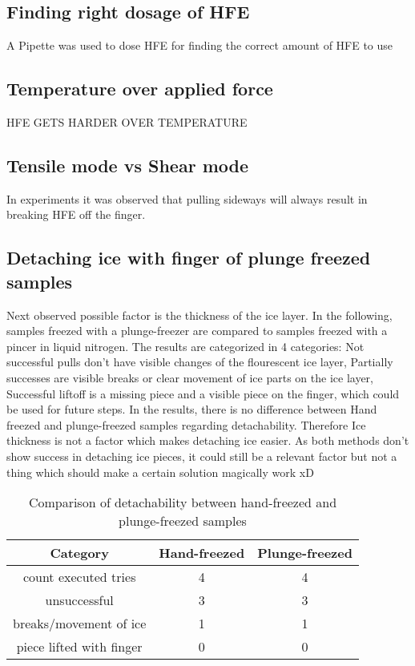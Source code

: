 \subsection{Finding right dosage of HFE}
A Pipette was used to dose HFE for finding the correct amount of HFE to use 

	
\subsection{Temperature over applied force}

HFE GETS HARDER OVER TEMPERATURE

\subsection{Tensile mode vs Shear mode}

In experiments it was observed that pulling sideways will always result in breaking HFE off the finger.

\subsection{Detaching ice with finger of plunge freezed samples}

Next observed possible factor is the thickness of the ice layer. In the following, samples freezed with a plunge-freezer are compared to samples freezed with a pincer in liquid nitrogen. The results are categorized in 4 categories: Not successful pulls don't have visible changes of the flourescent ice layer, Partially successes are visible breaks or clear movement of ice parts on the ice layer, Successful liftoff is a missing piece and a visible piece on the finger, which could be used for future steps. In the results, there is no difference between Hand freezed and plunge-freezed samples regarding detachability. Therefore Ice thickness is not a factor which makes detaching ice easier. As both methods don't show success in detaching ice pieces, it could still be a relevant factor but not a thing which should make a certain solution magically work xD

\begin{table}
	\centering
	\begin{tabular}{|c|c|c|}
		\hline
		Category & Hand-freezed & Plunge-freezed \\
		\hline
		\hline
		count executed tries & 4 & 4\\
		\hline
		unsuccessful & 3 & 3\\
		\hline
		breaks/movement of ice & 1 & 1\\
		\hline
		piece lifted with finger & 0 & 0\\
		\hline		
	\end{tabular}
	\caption{Comparison of detachability between hand-freezed and plunge-freezed samples}
\end{table}

